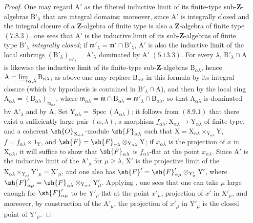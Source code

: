 \begin{proof}
\medskip
One may regard $\mathrm{A}'$ as the filtered inductive limit of its finite-type sub-$\mathbf{Z}$-algebras
$\mathrm{B}'_\lambda$ that are integral domains; moreover, since $\mathrm{A}'$ is integrally closed and the integral
closure of a $\mathbf{Z}$-algebra of finite type is also a $\mathbf{Z}$-algebra of finite type $(7.8.3)$, one
sees that $\mathrm{A}'$ is the inductive limit of its sub-$\mathbf{Z}$-algebras of finite type $\mathrm{B}'_\lambda$ \emph{integrally closed};
if $\mathfrak{m}'_\lambda=\mathfrak{m}'\cap\mathrm{B}'_\lambda$, $\mathrm{A}'$ is also the inductive limit of the local subrings $(\mathrm{B}'_\lambda)_{\mathfrak{m}'_\lambda}=\mathrm{A}'_\lambda$
dominated by $\mathrm{A}'$ $(5.13.3)$. For every $\lambda$, $\mathrm{B}'_\lambda\cap\mathrm{A}$ is likewise the inductive limit of its finite-type
sub-$\mathbf{Z}$-algebras $\mathrm{B}_{\alpha\lambda}$, hence $\mathrm{A}=\varinjlim_{\alpha,\lambda}\mathrm{B}_{\alpha\lambda}$; as above one may replace $\mathrm{B}_{\alpha\lambda}$
in this formula by its integral closure (which by hypothesis is contained in $\mathrm{B}'_\lambda\cap\mathrm{A}$), and then by the local ring
$\mathrm{A}_{\alpha\lambda}=(\mathrm{B}_{\alpha\lambda})_{\mathfrak{m}_{\alpha\lambda}}$, where
$\mathfrak{m}_{\alpha\lambda}=\mathfrak{m}\cap\mathrm{B}_{\alpha\lambda}=\mathfrak{m}'_\lambda\cap\mathrm{B}_{\alpha\lambda}$, so that $\mathrm{A}_{\alpha\lambda}$ is dominated by $\mathrm{A}'_\lambda$ and by $\mathrm{A}$.
Set $\mathrm{Y}_{\alpha\lambda}=\operatorname{Spec}(\mathrm{A}_{\alpha\lambda})$; it follows from $(8.9.1)$ that there exist a sufficiently large pair
$(\alpha,\lambda)$, a morphism $f_{\alpha\lambda}:\mathrm{X}_{\alpha\lambda}\to\mathrm{Y}_{\alpha\lambda}$ of finite type, and a
coherent $\sh{O}_{\mathrm{X}_{\alpha\lambda}}$-module $\sh{F}_{\alpha\lambda}$ such that
$\mathrm{X}=\mathrm{X}_{\alpha\lambda}\times_{\mathrm{Y}_{\alpha\lambda}}\mathrm{Y}$,
$f=f_{\alpha\lambda}\times 1_\mathrm{Y}$, and $\sh{F}=\sh{F}_{\alpha\lambda}\otimes_{\mathrm{Y}_{\alpha\lambda}}\mathrm{Y}$; if $x_{\alpha\lambda}$
is the projection of $x$ in $\mathrm{X}_{\alpha\lambda}$, it will suffice to show that $\sh{F}_{\alpha\lambda}$ is $f_{\alpha\lambda}$-flat at the point $x_{\alpha\lambda}$.
Since $\mathrm{A}'$ is the inductive limit of the $\mathrm{A}'_\mu$ for $\mu\geq\lambda$, $\mathrm{X}'$ is the projective limit of the
$\mathrm{X}_{\alpha\lambda}\times_{\mathrm{Y}_{\alpha\lambda}}\mathrm{Y}'_\mu=\mathrm{X}'_\mu$, and one also has
$\sh{F}'=\sh{F}'_{\alpha\mu}\otimes_{\mathrm{Y}'_\mu}\mathrm{Y}'$, where
$\sh{F}'_{\alpha\mu}=\sh{F}_{\alpha\lambda}\otimes_{\mathrm{Y}_{\alpha\lambda}}\mathrm{Y}'_\mu$. Applying
, one sees that one can take $\mu$ large enough for $\sh{F}'_{\alpha\mu}$ to be $\mathrm{Y}'_\mu$-flat at the
point $x'_\mu$, projection of $x'$ in $\mathrm{X}'_\mu$, and moreover, by construction of the $\mathrm{A}'_\mu$, the projection
of $x'_\mu$ in $\mathrm{Y}'_\mu$ is the closed point of $\mathrm{Y}'_\mu$.


\end{proof}
